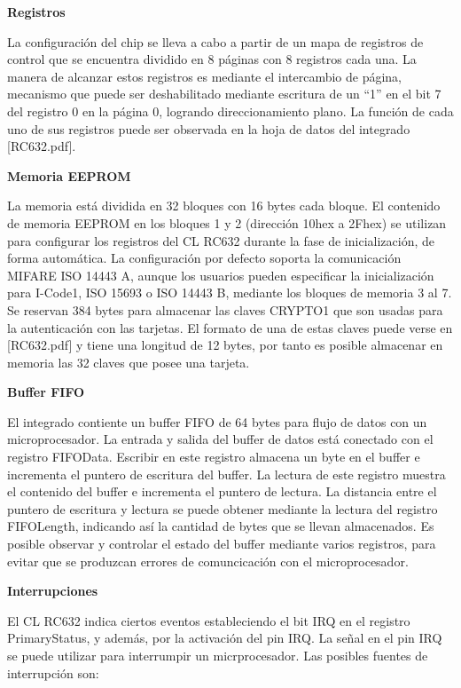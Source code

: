 \bigskip
{\bf{Registros}}

La configuración del chip se lleva a cabo a partir de un mapa de registros de control que se encuentra dividido en 8 páginas con 8 registros cada una. La manera de alcanzar estos registros es mediante el intercambio de página, mecanismo que puede ser deshabilitado mediante escritura de un “1” en el bit 7 del registro 0 en la página 0, logrando direccionamiento plano. La función de cada uno de sus registros puede ser observada en la hoja de datos del integrado [RC632.pdf].

\bigskip
{\bf{Memoria EEPROM}}

La memoria está dividida en 32 bloques con 16 bytes cada bloque.
El contenido de memoria EEPROM en los bloques 1 y 2 (dirección 10hex a 2Fhex) se utilizan para configurar los registros del CL RC632 durante la fase de inicialización, de forma automática.
La configuración por defecto soporta la comunicación MIFARE ISO 14443 A, aunque los usuarios pueden especificar la inicialización para I-Code1, ISO 15693 o ISO 14443 B, mediante los bloques de memoria 3 al 7.
Se reservan 384 bytes para almacenar las claves CRYPTO1 que son usadas para la autenticación con las tarjetas. El formato de una de estas claves puede verse en [RC632.pdf] y tiene una longitud de 12 bytes, por tanto es posible almacenar en memoria las 32 claves que posee una tarjeta.

\bigskip
{\bf{Buffer FIFO}}

El integrado contiente un buffer FIFO de 64 bytes para flujo de datos con un microprocesador.
La entrada y salida del buffer de datos está conectado con el registro FIFOData. Escribir en este registro almacena un byte en el buffer e incrementa el puntero de escritura del buffer. La lectura de este registro muestra el contenido del buffer e incrementa el puntero de lectura. La distancia entre el puntero de escritura y lectura se puede obtener mediante la lectura del registro FIFOLength, indicando así la cantidad de bytes que se llevan almacenados. Es posible observar y controlar el estado del buffer mediante varios registros, para evitar que se produzcan errores de comuncicación con el microprocesador.

\bigskip
{\bf{Interrupciones}}

El CL RC632 indica ciertos eventos estableciendo el bit IRQ en el registro PrimaryStatus, y además, por la activación del pin IRQ. La señal en el pin IRQ se puede utilizar para interrumpir un micrprocesador. 
Las posibles fuentes de interrupción son: 

